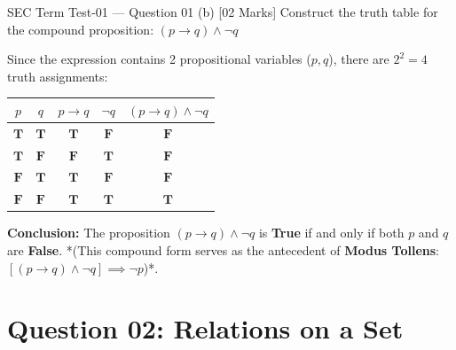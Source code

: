 \documentclass[11pt,a4paper]{article}
\begin{document}
\vspace{2pt}

\begin{exambox}[before skip=3pt, after skip=3pt]{SEC Term Test-01 --- Question 01 (b) \hfill [02 Marks]}
\Qlabel
Construct the truth table for the compound proposition:
$
(p \to q) \wedge \neg q
$

\tcblower

\Alabel
Since the expression contains 2 propositional variables ($p, q$), there are $2^2 = 4$ truth assignments:

\begin{center}
\small
\renewcommand{\arraystretch}{1.15}
\begin{tabular}{cc|c|c|c}
\toprule
\rowcolor{navy!15}
\textbf{\color{navy}$p$} & \textbf{\color{navy}$q$} & \textbf{\color{navy}$p \to q$} & \textbf{\color{navy}$\neg q$} & \textbf{\color{navy}$(p \to q) \wedge \neg q$} \\
\midrule
$\mathbf{T}$ & $\mathbf{T}$ & $\mathbf{T}$ & $\mathbf{F}$ & $\mathbf{F}$ \\
$\mathbf{T}$ & $\mathbf{F}$ & $\mathbf{F}$ & $\mathbf{T}$ & $\mathbf{F}$ \\
$\mathbf{F}$ & $\mathbf{T}$ & $\mathbf{T}$ & $\mathbf{F}$ & $\mathbf{F}$ \\
\rowcolor{lightteal!60}
$\mathbf{F}$ & $\mathbf{F}$ & $\mathbf{T}$ & $\mathbf{T}$ & $\mathbf{T}$ \\
\bottomrule
\end{tabular}
\end{center}

\vspace{-2pt}
\textbf{Conclusion:}
The proposition $(p \to q) \wedge \neg q$ is \textbf{True} if and only if both $p$ and $q$ are \textbf{False}. 
*(This compound form serves as the antecedent of \textbf{Modus Tollens}: $[(p \to q) \wedge \neg q] \implies \neg p$)*.
\end{exambox}

\newpage

\section{Question 02: Relations on a Set}
\end{document}

